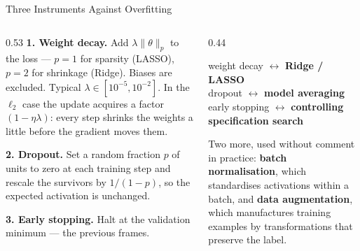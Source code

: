 \begin{frame}{Three Instruments Against Overfitting}
\begin{columns}[T]
\begin{column}{0.53\textwidth}
\small
\textbf{1. Weight decay.} Add $\lambda\lVert\theta\rVert_p$ to the loss --- $p=1$ for sparsity (LASSO), $p=2$ for shrinkage (Ridge). Biases are excluded. Typical $\lambda\in[10^{-5},10^{-2}]$. In the $\ell_2$ case the update acquires a factor $(1-\eta\lambda)$: every step shrinks the weights a little before the gradient moves them.
\medskip

\textbf{2. Dropout.} Set a random fraction $p$ of units to zero at each training step and rescale the survivors by $1/(1-p)$, so the expected activation is unchanged.
\medskip

\textbf{3. Early stopping.} Halt at the validation minimum --- the previous frames.
\end{column}
\begin{column}{0.44\textwidth}
\begin{takeawaybox}[title=\textbf{The econometric row}]\small
weight decay $\leftrightarrow$ \textbf{Ridge / LASSO}\\[0.7mm]
dropout $\leftrightarrow$ \textbf{model averaging}\\[0.7mm]
early stopping $\leftrightarrow$ \textbf{controlling specification search}
\end{takeawaybox}
\medskip
\begin{examplebox}\footnotesize
Two more, used without comment in practice: \textbf{batch normalisation}, which standardises activations within a batch, and \textbf{data augmentation}, which manufactures training examples by transformations that preserve the label.
\end{examplebox}
\end{column}
\end{columns}
\vspace{1mm}
\end{frame}

